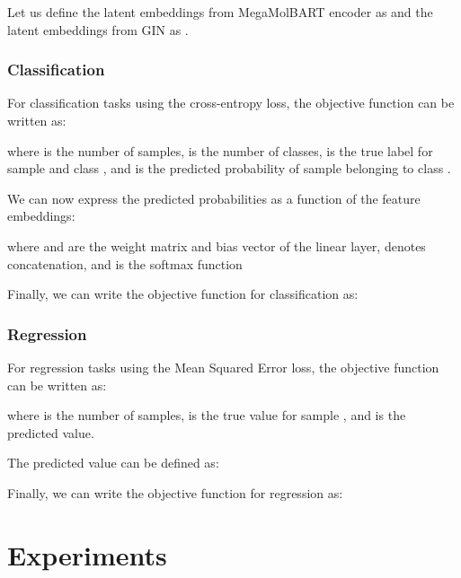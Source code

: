 \documentclass[sigconf,nonacm]{acmart}
\begin{document}
Let us define the latent embeddings from MegaMolBART encoder as  and the latent embeddings from GIN as .
\subsubsection{Classification}
For classification tasks using the cross-entropy loss, the objective function can be written as:


where  is the number of samples,  is the number of classes,  is the true label for sample  and class , and  is the predicted probability of sample  belonging to class .

We can now express the predicted probabilities as a function of the feature embeddings:



where  and  are the weight matrix and bias vector of the linear layer,  denotes concatenation, and  is the softmax function


Finally, we can write the  objective function for classification as:


\subsubsection{Regression}
For regression tasks using the Mean Squared Error loss, the objective function can be written as: 

where  is the number of samples,  is the true value for sample , and  is the predicted value.

The predicted value  can be defined as:


Finally, we can write the objective function for regression as:






























 






\section{Experiments}
\end{document}
